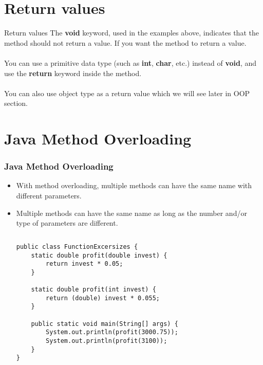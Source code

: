 \documentclass{beamer}
\begin{document}
\section{Return values}

\begin{frame}{Return values}
The \textbf{void} keyword, used in the examples above, indicates that the method should not return a value. If you want the method to return a value.\\~\\ You can use a primitive data type (such as \textbf{int}, \textbf{char}, etc.) instead of \textbf{void}, and use the \textbf{return} keyword inside the method. \\~\\
You can also use object type as a return value which we will see later in OOP section.

\end{frame}


\section{Java Method Overloading}

\begin{frame}[fragile]
\frametitle{Java Method Overloading}
\begin{itemize}
\item With method overloading, multiple methods can have the same name with different parameters.\\
\item Multiple methods can have the same name as long as the number and/or type of parameters are different.\\
\begin{columns}[T]
\begin{column}{\textwidth}
\begin{lstlisting}
public class FunctionExcersizes {
    static double profit(double invest) {
        return invest * 0.05;
    }

    static double profit(int invest) {
        return (double) invest * 0.055;
    }

    public static void main(String[] args) {
        System.out.println(profit(3000.75));
        System.out.println(profit(3100));
    }
}
\end{lstlisting}
\end{column}
\end{columns}
\end{itemize}


\end{frame}
\end{document}
